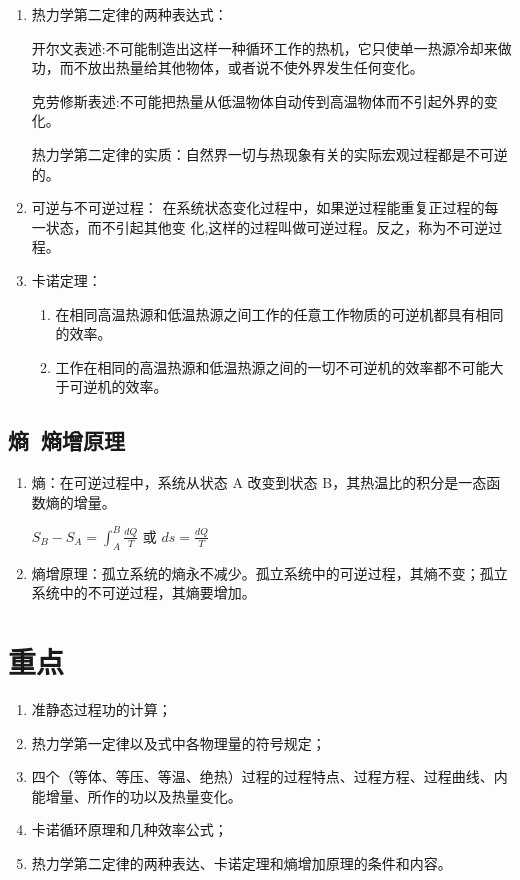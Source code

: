 \begin{enumerate}
    \item 热力学第二定律的两种表达式：
    
    开尔文表述:不可能制造出这样一种循环工作的热机，它只使单一热源冷却来做   功，而不放出热量给其他物体，或者说不使外界发生任何变化。    
    
    克劳修斯表述:不可能把热量从低温物体自动传到高温物体而不引起外界的变化。
    
    热力学第二定律的实质：自然界一切与热现象有关的实际宏观过程都是不可逆的。

    \item 可逆与不可逆过程：
    在系统状态变化过程中，如果逆过程能重复正过程的每一状态，而不引起其他变  化,这样的过程叫做可逆过程。反之，称为不可逆过程。

    \item 卡诺定理：
    
    \begin{enumerate}
        \item 在相同高温热源和低温热源之间工作的任意工作物质的可逆机都具有相同的效率。
        
        \item 工作在相同的高温热源和低温热源之间的一切不可逆机的效率都不可能大于可逆机的效率。
    \end{enumerate}
\end{enumerate}

\subsection{熵\ 熵增原理}

\begin{enumerate}
    \item 熵：在可逆过程中，系统从状态 A 改变到状态 B，其热温比的积分是一态函数熵的增量。
    
    $ S_B - S_A = \int_A^B{\frac{dQ}{T}}$ 或 $ ds = \frac{dQ}{T} $
    
    \item 熵增原理：孤立系统的熵永不减少。孤立系统中的可逆过程，其熵不变；孤立系统中的不可逆过程，其熵要增加。

\end{enumerate}

\section{重点}

\begin{enumerate}
    \item 准静态过程功的计算；
    \item 热力学第一定律以及式中各物理量的符号规定；
    \item 四个（等体、等压、等温、绝热）过程的过程特点、过程方程、过程曲线、内能增量、所作的功以及热量变化。
    \item 卡诺循环原理和几种效率公式；
    \item 热力学第二定律的两种表达、卡诺定理和熵增加原理的条件和内容。
\end{enumerate}

